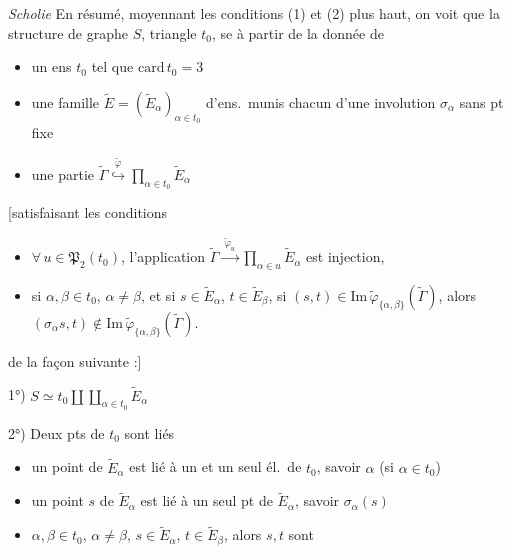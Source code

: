 \documentclass[11pt,a4paper]{article}
\begin{document}
\emph{Scholie} En résumé, moyennant les conditions (1) et (2) plus haut, on voit que la structure de graphe $S$,  triangle $t_0$, se  à partir de la donnée de
\begin{itemize}
  \item[a)] un ens $t_0$ tel que $\mathrm{card}\,t_0=3$
  \item[b)] une famille $\widetilde{E}=(\widetilde{E}_{\alpha})_{\alpha\in t_0}$ d'ens.\ munis chacun d'une involution $\sigma_{\alpha}$ sans pt fixe
  \item[c)] une partie $\widetilde{\Gamma}\overset{\widetilde{\varphi}}{\hookrightarrow}\prod_{\alpha\in t_0}\widetilde{E}_{\alpha}$ 
\end{itemize}
[satisfaisant les conditions
\begin{itemize}
  \item[(*)] $\forall\, u\in\mathfrak{P}_2(t_0)$, l'application $\widetilde{\Gamma}\xrightarrow{\ \widetilde{\varphi}_u\ }\prod_{\alpha\in u}\widetilde{E}_{\alpha}$ est injection,
  \item[(**)] si $\alpha,\beta\in t_0$, $\alpha\neq\beta$, et si $s\in\widetilde{E}_{\alpha}$, $t\in\widetilde{E}_{\beta}$, si $(s,t)\in\mathrm{Im}\,\widetilde{\varphi}_{\{\alpha,\beta\}}(\widetilde{\Gamma})$, alors $(\sigma_{\alpha}s,t)\notin\mathrm{Im}\,\widetilde{\varphi}_{\{\alpha,\beta\}}(\widetilde{\Gamma})$.
\end{itemize}
 de la façon suivante :]

1°) $S\simeq t_0\amalg\coprod_{\alpha\in t_0}\widetilde{E}_{\alpha}$

2°)  \struck{$\alpha$)} Deux pts de $t_0$ sont liés
\begin{itemize}
  \item[$\beta$)] un point de $\widetilde{E}_{\alpha}$ est lié à un et un seul él.\ de $t_0$, savoir $\alpha$ (si $\alpha\in t_0$)
  \item[$\gamma$)] un point $s$ de $\widetilde{E}_{\alpha}$ est lié à un  seul pt de $\widetilde{E}_{\alpha}$, savoir $\sigma_{\alpha}(s)$
  \item[$\delta$)]   $\alpha,\beta\in t_0$, $\alpha\neq\beta$, $s\in\widetilde{E}_{\alpha}$, $t\in\widetilde{E}_{\beta}$, alors $s,t$ sont

\end{itemize}
\end{document}
